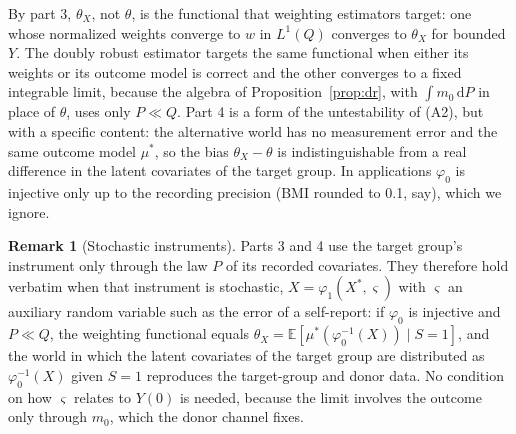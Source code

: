 \documentclass[11pt,a4paper]{article}
\newcommand{\E}{\mathbb{E}}
\newcommand{\dd}{\,\mathrm{d}}
\theoremstyle{plain}
\theoremstyle{definition}
\newtheorem{remark}{Remark}
\begin{document}
By part 3, $\theta_X$, not $\theta$, is the functional that weighting estimators target: one whose normalized weights converge to $w$ in $L^1(Q)$ converges to $\theta_X$ for bounded $Y$. The doubly robust estimator targets the same functional when either its weights or its outcome model is correct and the other converges to a fixed integrable limit, because the algebra of Proposition~\ref{prop:dr}, with $\int m_0\dd P$ in place of $\theta$, uses only $P\ll Q$. Part 4 is a form of the untestability of (A2), but with a specific content: the alternative world has no measurement error and the same outcome model $\mu^*$, so the bias $\theta_X-\theta$ is indistinguishable from a real difference in the latent covariates of the target group. In applications $\varphi_0$ is injective only up to the recording precision (BMI rounded to 0.1, say), which we ignore.

\begin{remark}[Stochastic instruments]\label{rem:stochastic}
Parts 3 and 4 use the target group's instrument only through the law $P$ of its recorded covariates. They therefore hold verbatim when that instrument is stochastic, $X=\varphi_1(X^*,\varsigma)$ with $\varsigma$ an auxiliary random variable such as the error of a self-report: if $\varphi_0$ is injective and $P\ll Q$, the weighting functional equals $\theta_X=\E[\mu^*(\varphi_0^{-1}(X))\mid S=1]$, and the world in which the latent covariates of the target group are distributed as $\varphi_0^{-1}(X)$ given $S=1$ reproduces the target-group and donor data. No condition on how $\varsigma$ relates to $Y(0)$ is needed, because the limit involves the outcome only through $m_0$, which the donor channel fixes.
\end{remark}
\end{document}
